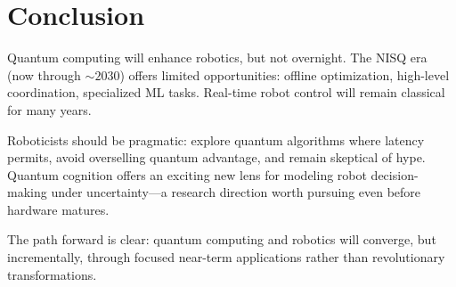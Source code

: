 \documentclass[conference]{IEEEtran}
\begin{document}
\section{Conclusion}

Quantum computing will enhance robotics, but not overnight. The NISQ era (now through $\sim2030$) offers limited opportunities: offline optimization, high-level coordination, specialized ML tasks. Real-time robot control will remain classical for many years.

Roboticists should be pragmatic: explore quantum algorithms where latency permits, avoid overselling quantum advantage, and remain skeptical of hype. Quantum cognition offers an exciting new lens for modeling robot decision-making under uncertainty---a research direction worth pursuing even before hardware matures.

The path forward is clear: quantum computing and robotics will converge, but incrementally, through focused near-term applications rather than revolutionary transformations.
\end{document}
